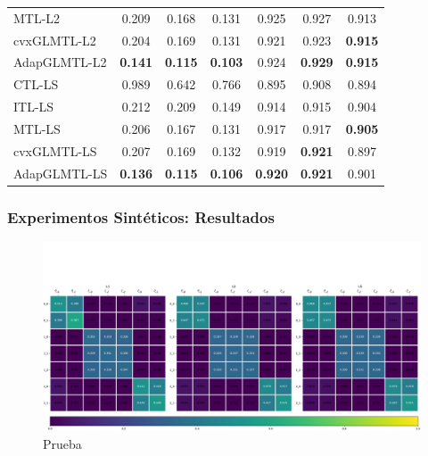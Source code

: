 \documentclass[aspectratio=43]{beamer}
\newcommand{\fmaxn}[1]{\textbf{#1}}
\newcommand{\fmod}[1]{\textsf{#1}}
\begin{document}
\begin{frame}
\begin{table}
{\begin{tabular}{lccc|ccc}
                \fmod{MTL-L2}       &            0.209 &            0.168 &            0.131         &             0.925 &             0.927 &             0.913 \\
                \fmod{cvxGLMTL-L2}     &            0.204 &            0.169 &            0.131       &             0.921 &             0.923 &             \fmaxn{0.915} \\
                \fmod{AdapGLMTL-L2} &            \fmaxn{0.141} &            \fmaxn{0.115} &            \fmaxn{0.103}   &             0.924 &             \fmaxn{0.929} &             \fmaxn{0.915} \\
                \midrule
                \fmod{CTL-LS}             &            0.989 &            0.642 &            0.766               &             0.895 &             0.908 &             0.894 \\
                \fmod{ITL-LS}             &            0.212 &            0.209 &            0.149               &             0.914 &             0.915 &             0.904 \\
                \fmod{MTL-LS}       &            0.206 &            0.167 &            0.131         &             0.917 &             0.917 &             \fmaxn{0.905} \\
                \fmod{cvxGLMTL-LS}     &            0.207 &            0.169 &            0.132       &             0.919 &             \fmaxn{0.921} &             0.897 \\
                \fmod{AdapGLMTL-LS} &            \fmaxn{0.136} &            \fmaxn{0.115} &            \fmaxn{0.106}   &             \fmaxn{0.920} &             \fmaxn{0.921} &             0.901 \\
                \bottomrule
            \end{tabular}
            }
        \end{table}

\end{frame}

\begin{frame}
      \frametitle{Experimentos Sintéticos: Resultados}
      
      \centering
      \begin{figure}
            \includegraphics[width=.85\textwidth]{Chapter6/IGPL2022/adjMatrix_all__regClusters_0.pdf}
            \caption{Prueba}
      \end{figure}

\end{frame}
\end{document}

